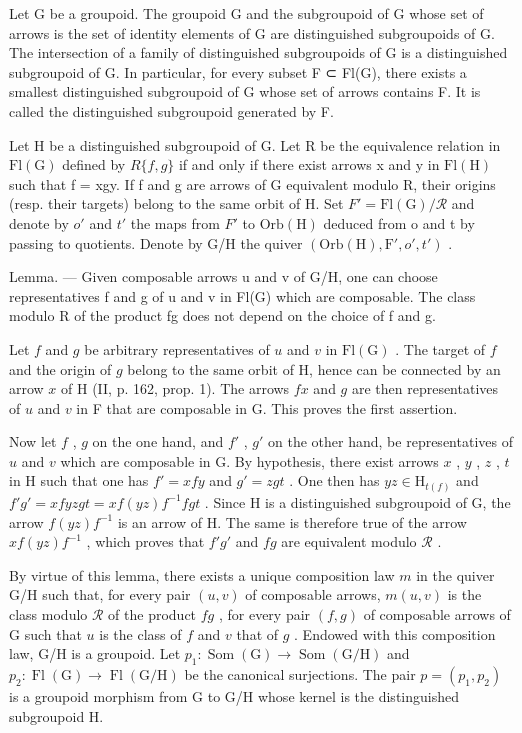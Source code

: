 Let G be a groupoid. The groupoid G and the subgroupoid of G whose set of arrows is the set of identity elements of G are distinguished subgroupoids of G. The intersection of a family of distinguished subgroupoids of G is a distinguished subgroupoid of G. In particular, for every subset F ⊂ Fl(G), there exists a smallest distinguished subgroupoid of G whose set of arrows contains F. It is called the distinguished subgroupoid generated by F.

Let H be a distinguished subgroupoid of G. Let R be the equivalence relation in \(\mathrm{Fl}(\mathrm{G})\) defined by \(R\{f,g\}\) if and only if there exist arrows x and y in \(\mathrm{Fl}(\mathrm{H})\) such that f = xgy. If f and g are arrows of G equivalent modulo R, their origins (resp. their targets) belong to the same orbit of H. Set \(F' = \mathrm{Fl}(\mathrm{G}) / \mathcal{R}\) and denote by \(o'\) and \(t'\) the maps from \(F'\) to \(\mathrm{Orb}(\mathrm{H})\) deduced from o and t by passing to quotients. Denote by G/H the quiver \((\mathrm{Orb}(\mathrm{H}), \mathrm{F}', o', t')\) .

Lemma. --- Given composable arrows u and v of G/H, one can choose representatives f and g of u and v in Fl(G) which are composable. The class modulo R of the product fg does not depend on the choice of f and g.

Let \(f\) and \(g\) be arbitrary representatives of \(u\) and \(v\) in \(\mathrm{Fl(G)}\) . The target of \(f\) and the origin of \(g\) belong to the same orbit of H, hence can be connected by an arrow \(x\) of H (II, p. 162, prop. 1). The arrows \(fx\) and \(g\) are then representatives of \(u\) and \(v\) in F that are composable in G. This proves the first assertion.

Now let \(f\) , \(g\) on the one hand, and \(f'\) , \(g'\) on the other hand, be representatives of \(u\) and \(v\) which are composable in G. By hypothesis, there exist arrows \(x\) , \(y\) , \(z\) , \(t\) in H such that one has \(f' = xfy\) and \(g' = zgt\) . One then has \(yz \in \mathrm{H}_{t(f)}\) and \(f'g' = x f y z g t = x f(yz)f^{-1}f g t\) . Since H is a distinguished subgroupoid of G, the arrow \(f(yz)f^{-1}\) is an arrow of H. The same is therefore true of the arrow \(x f(yz)f^{-1}\) , which proves that \(f'g'\) and \(fg\) are equivalent modulo \(\mathcal{R}\) .

By virtue of this lemma, there exists a unique composition law \(m\) in the quiver G/H such that, for every pair \((u,v)\) of composable arrows, \(m(u,v)\) is the class modulo \(\mathcal{R}\) of the product \(fg\) , for every pair \((f,g)\) of composable arrows of G such that \(u\) is the class of \(f\) and \(v\) that of \(g\) . Endowed with this composition law, G/H is a groupoid. Let \(p_1\colon \operatorname{Som}(\mathrm{G}) \to \operatorname{Som}(\mathrm{G}/\mathrm{H})\) and \(p_2\colon \operatorname{Fl}(\mathrm{G}) \to \operatorname{Fl}(\mathrm{G}/\mathrm{H})\) be the canonical surjections. The pair \(p = (p_1,p_2)\) is a groupoid morphism from G to G/H whose kernel is the distinguished subgroupoid H.


